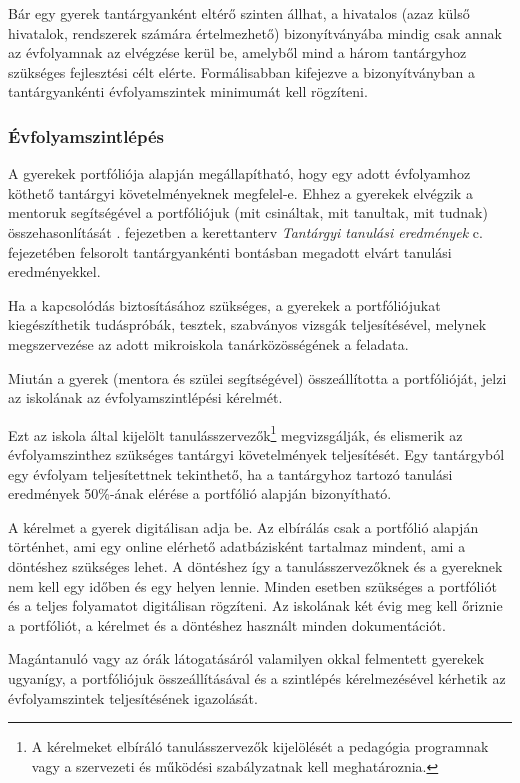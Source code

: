 Bár egy gyerek tantárgyanként eltérő szinten állhat, a hivatalos (azaz külső
hivatalok, rendszerek számára értelmezhető) bizonyítványába mindig csak annak
az évfolyamnak az elvégzése kerül be, amelyből mind a három tantárgyhoz
szükséges fejlesztési célt elérte. Formálisabban kifejezve a bizonyítványban a
tantárgyankénti évfolyamszintek minimumát kell rögzíteni.

\subsubsection{Évfolyamszintlépés}
\label{sec:evfolyamszintlepes}
A gyerekek portfóliója alapján megállapítható, hogy egy adott évfolyamhoz
köthető tantárgyi követelményeknek megfelel-e.
Ehhez a gyerekek elvégzik a mentoruk segítségével a portfóliójuk (mit csináltak,
mit tanultak, mit tudnak) összehasonlítását \ifkerettanterv
      .
      fejezetben
\else
      a kerettanterv \emph{Tantárgyi tanulási eredmények} c. fejezetében
\fi
felsorolt tantárgyankénti bontásban megadott elvárt tanulási eredményekkel.

Ha a kapcsolódás biztosításához szükséges, a gyerekek a portfóliójukat
kiegészíthetik tudáspróbák, tesztek, szabványos vizsgák teljesítésével, melynek
megszervezése az adott mikroiskola tanárközösségének a feladata.

Miután a gyerek (mentora és szülei segítségével) összeállította a portfólió\-ját,
jelzi az iskolának az évfolyamszintlépési kérelmét.

Ezt az iskola által kijelölt tanulásszervezők\footnote{A kérelmeket elbíráló
      tanulásszervezők kijelölését a pedagógia programnak vagy a szervezeti és
      működési szabályzatnak kell meghatároznia.}  
megvizsgálják, és elismerik az
évfolyamszinthez szükséges tantárgyi követelmények teljesítését.
Egy tantárgyból egy évfolyam teljesítettnek tekinthető, ha a tantárgyhoz
tartozó tanulási eredmények 50\%-ának elérése a portfólió alapján bizonyítható.

A kérelmet a gyerek digitálisan adja be.
Az elbírálás csak a portfólió alapján történhet, ami egy
online elérhető adatbázisként tartalmaz mindent, ami a döntéshez szükséges
lehet. A döntéshez így a tanulásszervezőknek és a gyereknek nem
kell egy időben és egy helyen lennie. Minden esetben szükséges a portfóliót és
a teljes folyamatot digitálisan rögzíteni.
Az iskolának két évig meg kell őriznie a portfóliót, a kérelmet és a döntéshez
használt minden dokumentációt.

Magántanuló vagy az órák látogatásáról valamilyen okkal
felmentett gyerekek ugyanígy, a portfóliójuk összeállításával és a szintlépés
kérelmezésével kérhetik az évfolyamszintek teljesítésének igazolását.

